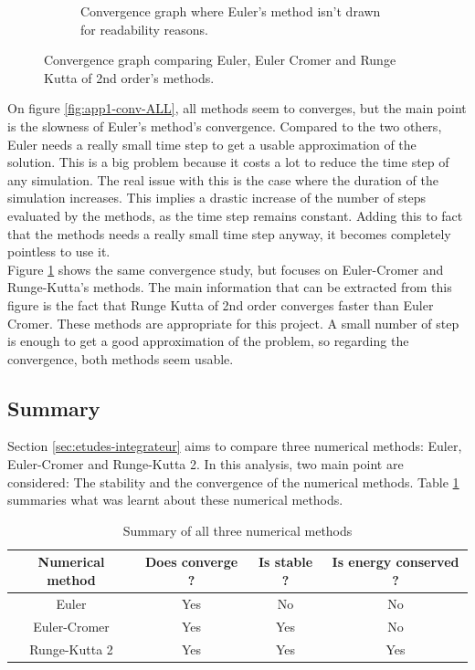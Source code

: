 \documentclass[a4paper,12pt,twoside]{article}
\begin{document}
\begin{figure}[h]
\begin{subfigure}[t]{0.45\textwidth}
	\caption{Convergence graph where Euler's method isn't drawn for readability reasons.}
	\label{fig:app1-conv-noEuler}
\end{subfigure}
\caption{Convergence graph comparing Euler, Euler Cromer and Runge Kutta of 2nd order's methods.}
\label{fig:app1-conv}
\end{figure}

On figure \ref{fig:app1-conv-ALL}, all methods seem to converges, but the main point is the slowness of Euler's method's convergence.
Compared to the two others, Euler needs a really small time step to get a usable approximation of the solution.
This is a big problem because it costs a lot to reduce the time step of any simulation.
The real issue with this is the case where the duration of the simulation increases.
This implies a drastic increase of the number of steps evaluated by the methods, as the time step remains constant.
Adding this to fact that the methods needs a really small time step anyway, it becomes completely pointless to use it.\\

Figure \ref{fig:app1-conv-noEuler} shows the same convergence study, but focuses on Euler-Cromer and Runge-Kutta's methods.
The main information that can be extracted from this figure is the fact that Runge Kutta of 2nd order converges faster than Euler Cromer.
These methods are appropriate for this project.
A small number of step is enough to get a good approximation of the problem, so regarding the convergence, both methods seem usable.\\ %


\subsection{Summary}
Section \ref{sec:etudes-integrateur} aims to compare three numerical methods: Euler, Euler-Cromer and Runge-Kutta 2.
In this analysis, two main point are considered: The stability and the convergence of the numerical methods.
Table \ref{tab:comparaison-integrateur} summaries what was learnt about these numerical methods.\\

\begin{table}[h]
\centering
\begin{tabular}{c | c | c | c}
	Numerical method & Does converge ? & Is stable ? & Is energy conserved ? \\
	\hline
	Euler & Yes & No & No\\
	Euler-Cromer & Yes & Yes & No \\
	Runge-Kutta 2 & Yes & Yes & Yes\\
\end{tabular}
\caption{Summary of all three numerical methods}
\label{tab:comparaison-integrateur}
\end{table}
\end{document}
